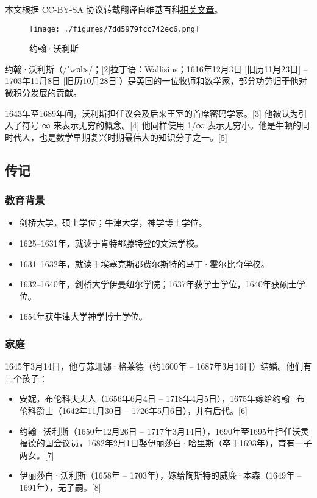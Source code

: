 
本文根据 CC-BY-SA 协议转载翻译自维基百科\href{https://en.wikipedia.org/wiki/John_Wallis}{相关文章}。

\begin{figure}[ht]
\centering
\texttt{[image: ./figures/7dd5979fcc742ec6.png]}
\caption{约翰·沃利斯} \label{fig_YHALS_1}
\end{figure}
约翰·沃利斯（/ˈwɒlɪs/；[2]拉丁语：Wallisius；1616年12月3日 [旧历11月23日] – 1703年11月8日 [旧历10月28日]）是英国的一位牧师和数学家，部分功劳归于他对微积分发展的贡献。

1643年至1689年间，沃利斯担任议会及后来王室的首席密码学家。[3] 他被认为引入了符号 ∞ 来表示无穷的概念。[4] 他同样使用 1/∞ 表示无穷小。他是牛顿的同时代人，也是数学早期复兴时期最伟大的知识分子之一。[5]
\subsection{传记}
\subsubsection{教育背景}  
\begin{itemize}
\item 剑桥大学，硕士学位；牛津大学，神学博士学位。  
\item 1625–1631年，就读于肯特郡滕特登的文法学校。  
\item 1631–1632年，就读于埃塞克斯郡费尔斯特的马丁·霍尔比奇学校。  
\item 1632–1640年，剑桥大学伊曼纽尔学院；1637年获学士学位，1640年获硕士学位。  
\item 1654年获牛津大学神学博士学位。
\end{itemize}
\subsubsection{家庭}
1645年3月14日，他与苏珊娜·格莱德（约1600年 – 1687年3月16日）结婚。他们有三个孩子：
\begin{itemize}
\item 安妮，布伦科夫夫人（1656年6月4日 – 1718年4月5日），1675年嫁给约翰·布伦科爵士（1642年11月30日 – 1726年5月6日），并有后代。[6]
\item 约翰·沃利斯（1650年12月26日 – 1717年3月14日），1690年至1695年担任沃灵福德的国会议员，1682年2月1日娶伊丽莎白·哈里斯（卒于1693年），育有一子两女。[7]
\item 伊丽莎白·沃利斯（1658年 – 1703年），嫁给陶斯特的威廉·本森（1649年 – 1691年），无子嗣。[8]
\end{itemize}

